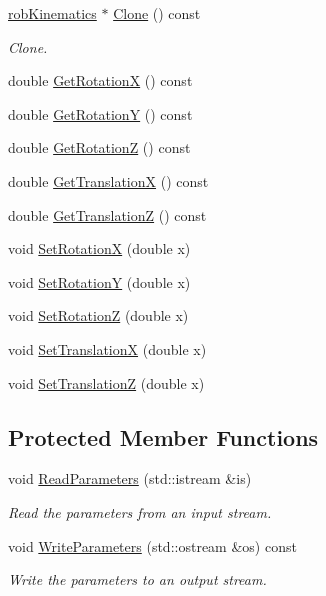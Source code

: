 \begin{DoxyCompactItemize}
\hyperlink{classrob_kinematics}{rob\-Kinematics} $\ast$ \hyperlink{classrob_hayati_a46b84e898c3df017074375c90cdac82b}{Clone} () const 
\begin{DoxyCompactList}\small\item\em Clone. \end{DoxyCompactList}\item 
double \hyperlink{classrob_hayati_abcb2d68f6a161ecccf9e6f725c8d721b}{Get\-Rotation\-X} () const 
\item 
double \hyperlink{classrob_hayati_af25da131e0690827aafe17dc3044ff7d}{Get\-Rotation\-Y} () const 
\item 
double \hyperlink{classrob_hayati_a639cec9c8b24de6a5d8fe9d5872712a0}{Get\-Rotation\-Z} () const 
\item 
double \hyperlink{classrob_hayati_aa84ace6d8c38ca6d5c6273b6a4f86b75}{Get\-Translation\-X} () const 
\item 
double \hyperlink{classrob_hayati_aaee5dcaf63efab3a3fd477853cceac66}{Get\-Translation\-Z} () const 
\item 
void \hyperlink{classrob_hayati_abf99a19942aaa3f27abf26589a25609a}{Set\-Rotation\-X} (double x)
\item 
void \hyperlink{classrob_hayati_ae6c0af41ad2469f6879923cbbb77f025}{Set\-Rotation\-Y} (double x)
\item 
void \hyperlink{classrob_hayati_a74f15dc16b8c10f1f4ef9722ce9715d5}{Set\-Rotation\-Z} (double x)
\item 
void \hyperlink{classrob_hayati_a52a475c5bfc90a9e0c72a3283bbbf23e}{Set\-Translation\-X} (double x)
\item 
void \hyperlink{classrob_hayati_a90c7af4c2a0e6211f2aaac1171f97310}{Set\-Translation\-Z} (double x)
\end{DoxyCompactItemize}
\subsection*{Protected Member Functions}
\begin{DoxyCompactItemize}
\item 
void \hyperlink{classrob_hayati_affd3856ec8770008d0757ddc1f9ce40d}{Read\-Parameters} (std\-::istream \&is)
\begin{DoxyCompactList}\small\item\em Read the parameters from an input stream. \end{DoxyCompactList}\item 
void \hyperlink{classrob_hayati_afe4cc7030ab2d8a249269afc4b7822c9}{Write\-Parameters} (std\-::ostream \&os) const 
\begin{DoxyCompactList}\small\item\em Write the parameters to an output stream. \end{DoxyCompactList}\end{DoxyCompactItemize}
